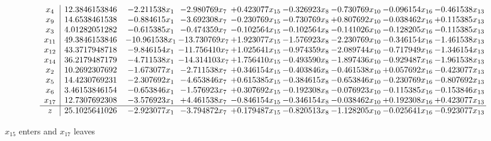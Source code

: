 \documentclass[10pt]{article}
\begin{document}
 \[\begin{array}{c| c c@{\hskip 2pt} c@{\hskip 2pt} c@{\hskip 2pt} c@{\hskip 2pt} c@{\hskip 2pt} c@{\hskip 2pt} c@{\hskip 2pt} }
 x_{4}   &  12.3846153846 & -2.211538 x_{1} & -2.980769 x_{7} & + 0.423077 x_{15} & -0.326923 x_{8} & -0.730769 x_{10} & -0.096154 x_{16} & -0.461538 x_{13}\\
 x_{9}   &  14.6538461538 & -0.884615 x_{1} & -3.692308 x_{7} & -0.230769 x_{15} & -0.730769 x_{8} & + 0.807692 x_{10} & -0.038462 x_{16} & + 0.115385 x_{13}\\
 x_{3}   &  4.01282051282 & -0.615385 x_{1} & -0.474359 x_{7} & -0.102564 x_{15} & -0.102564 x_{8} & -0.141026 x_{10} & -0.128205 x_{16} & -0.115385 x_{13}\\
 x_{11}   &  49.3846153846 & -10.961538 x_{1} & -13.730769 x_{7} & + 1.923077 x_{15} & -1.576923 x_{8} & -2.230769 x_{10} & -0.346154 x_{16} & -1.461538 x_{13}\\
 x_{12}   &  43.3717948718 & -9.846154 x_{1} & -11.756410 x_{7} & + 1.025641 x_{15} & -0.974359 x_{8} & -2.089744 x_{10} & -0.717949 x_{16} & -1.346154 x_{13}\\
 x_{14}   &  36.2179487179 & -4.711538 x_{1} & -14.314103 x_{7} & + 1.756410 x_{15} & -0.493590 x_{8} & -1.897436 x_{10} & -0.929487 x_{16} & -1.961538 x_{13}\\
 x_{2}   &  10.2692307692 & -1.673077 x_{1} & -2.711538 x_{7} & + 0.346154 x_{15} & -0.403846 x_{8} & -0.461538 x_{10} & + 0.057692 x_{16} & -0.423077 x_{13}\\
 x_{5}   &  14.4230769231 & -2.307692 x_{1} & -4.653846 x_{7} & + 0.615385 x_{15} & -0.384615 x_{8} & -0.653846 x_{10} & -0.230769 x_{16} & -0.807692 x_{13}\\
 x_{6}   &  3.46153846154 & -0.653846 x_{1} & -1.576923 x_{7} & + 0.307692 x_{15} & -0.192308 x_{8} & -0.076923 x_{10} & -0.115385 x_{16} & -0.153846 x_{13}\\
 x_{17}   &  12.7307692308 & -3.576923 x_{1} & + 4.461538 x_{7} & -0.846154 x_{15} & -0.346154 x_{8} & -0.038462 x_{10} & + 0.192308 x_{16} & + 0.423077 x_{13}\\
\hline
z    &  25.1025641026 & -2.923077 x_{1} & -3.794872 x_{7} & + 0.179487 x_{15} & -0.820513 x_{8} & -1.128205 x_{10} & -0.025641 x_{16} & -0.923077 x_{13}\\
\end{array}\]


 $ x_{15} $ enters and $ x_{17} $ leaves 
\end{document}
